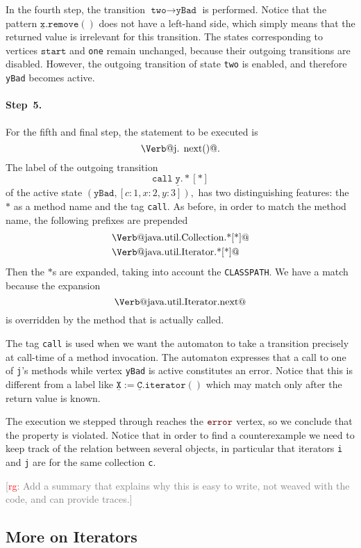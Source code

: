 \documentclass[preprint]{sigplanconf} %
\makeatletter
\newcommand{\note}[2]{\textcolor{gray}{[\textcolor{red}{#1}: #2]}}
\newcommand{\rg}[1]{\note{rg}{#1}}
\newcommand{\error}{\ensuremath{\textcolor{darkred}{\mathtt{error}}}\xspace}
\newcommand{\pattern}[1]{\ensuremath{\mathtt{\underline{#1}}}}
\newcommand{\start}{\ensuremath{\mathtt{start}}\xspace}
\newcommand{\verbline}[2][]{\[\text{\Verb@#2@}#1\]}
\theoremstyle{definition}
\theoremstyle{remark}
\makeatother
\begin{document}
In the fourth step, the transition $\texttt{two}\to\texttt{yBad}$ is performed.
Notice that the pattern $\pattern{x}.\mathtt{remove}()$ does not have a left-hand side, which simply means that the returned value is irrelevant for this transition.
The states corresponding to vertices \start and {\tt one} remain unchanged, because their outgoing transitions are disabled.
However,  the outgoing transition of state {\tt two} is enabled, and therefore {\tt yBad} becomes active.

\paragraph{Step~5.}

For the fifth and final step, the statement to be executed is \verbline[.]{j.\PY{n+na}{next}()}
The label of the outgoing transition  \[\mathtt{call}\;\pattern{y}.{*}[*]\] of the active state $(\texttt{yBad},[c:1,x:2,y:3]),$
has two distinguishing features: the~$*$ as a method name and the tag \texttt{call}.
As before, in order to match the method name, the following prefixes are prepended  
\begin{align*}
&\text{\Verb@java.util.Collection.*[*]@} \\
&\text{\Verb@java.util.Iterator.*[*]@}
\end{align*}
Then the $*$s are expanded, taking into account the \texttt{CLASSPATH}.
We have a match because the expansion \verbline{java.util.Iterator.next} is overridden by the method that is actually called.

The tag {\tt call} is used when we want the automaton to take a transition precisely at call-time of a method invocation.
The automaton expresses that a call to one of {\tt j}'s methods while vertex \texttt{yBad} is active constitutes an error.
Notice that this is different from a label like $\pattern X:=\pattern C.\mathtt{iterator}()$ which may match only after the return value is known.

\medskip
The execution we stepped through reaches the \error vertex, so we conclude that the property is violated.
Notice that in order to find a counterexample we need to keep track of the relation between several objects, in particular that iterators {\tt i} and {\tt j} are for the same collection {\tt c}.

\rg{Add a summary that explains why this is easy to write, not weaved with the code, and can provide traces.}

\subsection{More on Iterators} \label{sec:examples.iterators} %
\end{document}
